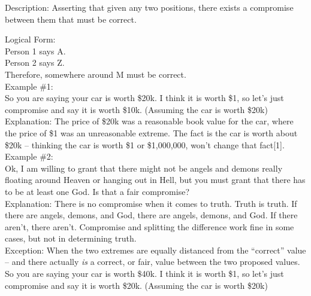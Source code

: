 \documentclass[a4paper,12pt,single,pdftex]{scrartcl}
\begin{document}
  
    Description: Asserting that given any two positions, there exists a compromise between them that must be correct.

    
      Logical Form:
    \\

    
      Person 1 says A.
    \\

    
      Person 2 says Z.
    \\

    
      Therefore, somewhere around M must be correct.
    \\

    
      Example \#1:
    \\

    
      So you are saying your car is worth \$20k.  I think it is worth \$1, so let’s just compromise and say it is worth \$10k. (Assuming the car is worth \$20k)
    \\

    
      Explanation: The price of \$20k was a reasonable book value for the car, where the price of \$1 was an unreasonable extreme.  The fact is the car is worth about \$20k -- thinking the car is worth \$1 or \$1,000,000, won’t change that fact[1].
    \\

    
      Example \#2:
    \\

    
      Ok, I am willing to grant that there might not be angels and demons really floating around Heaven or hanging out in Hell, but you must grant that there has to be at least one God.  Is that a fair compromise?
    \\

    
      Explanation: There is no compromise when it comes to truth.  Truth is truth.  If there are angels, demons, and God, there are angels, demons, and God.  If there aren’t, there aren’t.  Compromise and splitting the difference work fine in some cases, but not in determining truth.
    \\

    
      Exception: When the two extremes are equally distanced from the “correct” value -- and there actually {\it is} a correct, or fair, value between the two proposed values.
    \\

    
      So you are saying your car is worth \$40k.  I think it is worth \$1, so let’s just compromise and say it is worth \$20k. (Assuming the car is worth \$20k)
    \\
\end{document}

